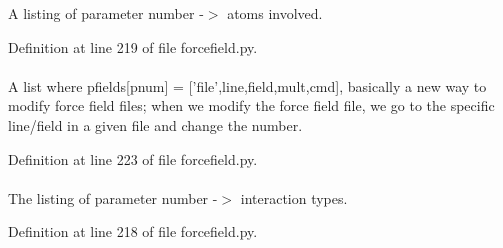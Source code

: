 \-A listing of parameter number -\/$>$ atoms involved. 



\-Definition at line 219 of file forcefield.\-py.

\hypertarget{classforcebalance_1_1forcefield_1_1FF_aa521223f43f9629b30384491cafbd10c}{
\paragraph[{pfields}]{}}\label{classforcebalance_1_1forcefield_1_1FF_aa521223f43f9629b30384491cafbd10c}


\-A list where pfields\mbox{[}pnum\mbox{]} = \mbox{[}'file',line,field,mult,cmd\mbox{]}, basically a new way to modify force field files; when we modify the force field file, we go to the specific line/field in a given file and change the number. 



\-Definition at line 223 of file forcefield.\-py.

\hypertarget{classforcebalance_1_1forcefield_1_1FF_a2d12bd53577f14af5e8d4b64ebb6281f}{
\paragraph[{plist}]{}}\label{classforcebalance_1_1forcefield_1_1FF_a2d12bd53577f14af5e8d4b64ebb6281f}


\-The listing of parameter number -\/$>$ interaction types. 



\-Definition at line 218 of file forcefield.\-py.

\hypertarget{classforcebalance_1_1BaseClass_afc6659278497d7245bc492ecf405ccae}{
\paragraph[{\-Print\-Option\-Dict}]{}}\label{classforcebalance_1_1BaseClass_afc6659278497d7245bc492ecf405ccae}


